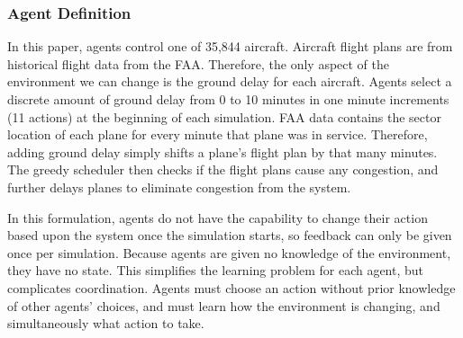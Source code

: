 \documentclass[smallcondensed]{svjour3}
\begin{document}
\subsubsection{Agent Definition}
In this paper, agents control one of 35,844 aircraft. Aircraft flight plans are from historical flight data from the FAA. Therefore, the only aspect of the environment we can change is the ground delay for each aircraft. Agents select a discrete amount of ground delay from 0 to 10 minutes in one minute increments (11 actions) at the beginning of each simulation. FAA data contains the sector location of each plane for every minute that plane was in service. Therefore, adding ground delay simply shifts a plane's flight plan by that many minutes. The greedy scheduler then checks if the flight plans cause any congestion, and further delays planes to eliminate congestion from the system.

In this formulation, agents do not have the capability to change their action based upon the system once the simulation starts, so feedback can only be given once per simulation. Because agents are given no knowledge of the environment, they have no state. This simplifies the learning problem for each agent, but complicates coordination. Agents must choose an action without prior knowledge of other agents' choices, and must learn how the environment is changing, and simultaneously what action to take.



\end{document}
